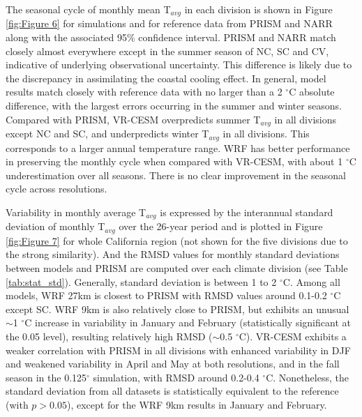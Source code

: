 \documentclass[draft,ms]{agutex}   %
\begin{document}
\begin{article}
The seasonal cycle of monthly mean T$_{avg}$ in each division is shown in Figure \ref{fig:Figure 6} for simulations and for reference data from PRISM and NARR along with the associated 95\% confidence interval. PRISM and NARR match closely almost everywhere except in the summer season of NC, SC and CV, indicative of underlying observational uncertainty. This difference is likely due to the discrepancy in assimilating the coastal cooling effect.  In general, model results match closely with reference data with no larger than a 2 $^\circ$C absolute difference, with the largest errors occurring in the summer and winter seasons.  Compared with PRISM, VR-CESM overpredicts summer T$_{avg}$ in all divisions except NC and SC, and underpredicts winter T$_{avg}$ in all divisions.  This corresponds to a larger annual temperature range. WRF has better performance in preserving the monthly cycle when compared with VR-CESM, with about 1 $^\circ$C underestimation over all seasons. There is no clear improvement in the seasonal cycle across resolutions.

Variability in monthly average T$_{avg}$ is expressed by the interannual standard deviation of monthly T$_{avg}$ over the 26-year period and is plotted in Figure \ref{fig:Figure 7} for whole California region (not shown for the five divisions due to the strong similarity). And the RMSD values for monthly standard deviations between models and PRISM are computed over each climate division (see Table \ref{tab:stat_std}). Generally, standard deviation is between 1 to 2 $^\circ$C. Among all models, WRF 27km is closest to PRISM with RMSD values around 0.1-0.2 $^\circ$C except SC. WRF 9km is also relatively close to PRISM, but exhibits an unusual $\sim$1 $^\circ$C increase in variability in January and February (statistically significant at the 0.05 level), resulting relatively high RMSD ($\sim$0.5 $^\circ$C). VR-CESM exhibits a weaker correlation with PRISM in all divisions with enhanced variability in DJF and weakened variability in April and May at both resolutions, and in the fall season in the 0.125$^\circ$ simulation, with RMSD around 0.2-0.4 $^\circ$C. Nonetheless, the standard deviation from all datasets is statistically equivalent to the reference (with $p > 0.05$), except for the WRF 9km results in January and February.


\end{article}
\end{document}
